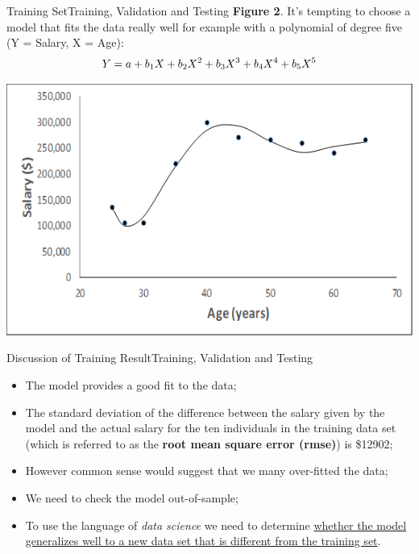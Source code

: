 \documentclass[11pt]{beamer}
\begin{document}
%
%
\begin{frame}{Training Set}{Training, Validation and Testing}
\textbf{Figure 2}. It's tempting to choose a model that fits the data really well for example with a polynomial of degree five (Y = Salary, X = Age):
	\begin{equation}
	Y = a + b_1X+b_2X^2+b_3X^3+b_4X^4+b_5X^5 \notag
	\end{equation}	 
	\begin{center}
	\includegraphics[scale=.6]{../05-pictures/lesson-2-1_pic_2.png}
	\end{center}
\end{frame}
%
%
\begin{frame}{Discussion of Training Result}{Training, Validation and Testing}
\begin{itemize}
\item The model provides a good fit to the data;
\item The standard deviation of the difference between the salary given by the model and the actual salary for the ten individuals in the training data set (which is referred to as the \textbf{root mean square error (rmse)}) is \$12902;
\item However common sense would suggest that we many over-fitted the data;
\item We need to check the model out-of-sample;
\item To use the language of \textit{data science} we need to determine \ul{whether the model generalizes well to a new data set that is different from the training set}.
\end{itemize}
\end{frame}
\end{document}
